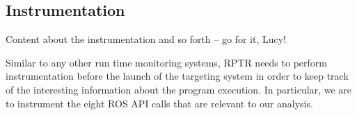 \subsection{Instrumentation}

Content about the instrumentation and so forth -- go for it, Lucy!

Similar to any other run time monitoring systems, RPTR needs to perform instrumentation before the launch of the targeting system in order to keep track of the interesting information about the program execution. In particular, we are to instrument the eight ROS API calls that are relevant to our analysis. 
